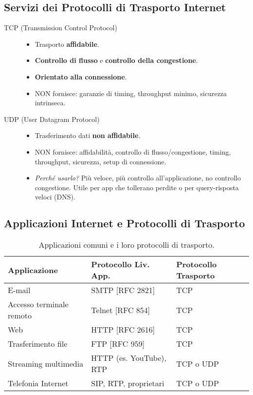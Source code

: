 \documentclass{article}
\begin{document}
\subsection{Servizi dei Protocolli di Trasporto Internet}
\begin{description}
    \item[TCP (Transmission Control Protocol)]
    \begin{itemize}
        \item Trasporto \textbf{affidabile}.
        \item \textbf{Controllo di flusso} e \textbf{controllo della congestione}.
        \item \textbf{Orientato alla connessione}.
        \item NON fornisce: garanzie di timing, throughput minimo, sicurezza intrinseca.
    \end{itemize}
    \item[UDP (User Datagram Protocol)]
    \begin{itemize}
        \item Trasferimento dati \textbf{non affidabile}.
        \item NON fornisce: affidabilità, controllo di flusso/congestione, timing, throughput, sicurezza, setup di connessione.
        \item \textit{Perché usarlo?} Più veloce, più controllo all'applicazione, no controllo congestione. Utile per app che tollerano perdite o per query-risposta veloci (DNS).
    \end{itemize}
\end{description}

\subsection{Applicazioni Internet e Protocolli di Trasporto}
\begin{table}[H]
\centering
\begin{tabular}{|l|l|l|}
\hline
\textbf{Applicazione}     & \textbf{Protocollo Liv. App.} & \textbf{Protocollo Trasporto} \\ \hline
E-mail                 & SMTP [RFC 2821]           & TCP                           \\
Accesso terminale remoto & Telnet [RFC 854]          & TCP                           \\
Web                    & HTTP [RFC 2616]           & TCP                           \\
Trasferimento file     & FTP [RFC 959]             & TCP                           \\
Streaming multimedia   & HTTP (es. YouTube), RTP   & TCP o UDP                     \\
Telefonia Internet     & SIP, RTP, proprietari     & TCP o UDP                     \\ \hline
\end{tabular}
\caption{Applicazioni comuni e i loro protocolli di trasporto.}
\end{table}
\end{document}
